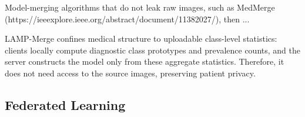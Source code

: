 \documentclass[letterpaper]{article}
\begin{document}
Model-merging algorithms that do not leak raw images, such as MedMerge (https://ieeexplore.ieee.org/abstract/document/11382027/), then ...


LAMP-Merge confines medical structure to uploadable class-level statistics: clients locally compute diagnostic class prototypes and prevalence counts, and the server constructs the model only from these aggregate statistics. Therefore, it does not need access to the source images, preserving patient privacy.


\subsection{Federated Learning}
\end{document}
